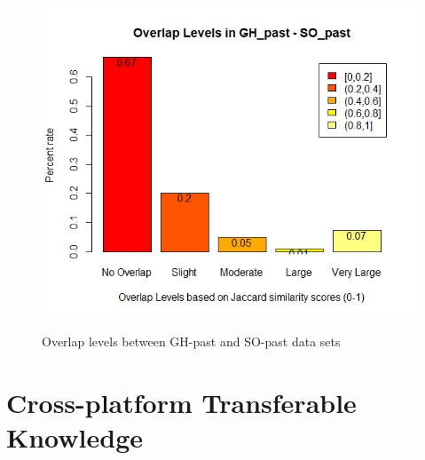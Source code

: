         \begin{figure}
          \centering
          \includegraphics[width=\textwidth]{figures/overlap_SO_GH_past.jpeg}\\
          \caption{Overlap levels between GH-past and SO-past data sets}
          \label{fig:overlap_GH_SO_past}
        \end{figure}
        
        
    
    \section{Cross-platform Transferable Knowledge\label{sec:results_rq3}}
        
